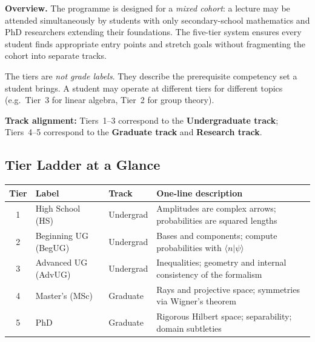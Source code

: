 \documentclass[11pt,a4paper]{article}
\begin{document}
\begin{tcolorbox}[goldbox]
\textbf{Overview.}
The programme is designed for a \emph{mixed cohort}: a lecture may be attended
simultaneously by students with only secondary-school mathematics and PhD
researchers extending their foundations.
The five-tier system ensures every student finds appropriate entry points and
stretch goals without fragmenting the cohort into separate tracks.

\medskip\noindent The tiers are \emph{not grade labels}. They describe the prerequisite
competency set a student brings. A student may operate at different tiers for
different topics (e.g.\ Tier~3 for linear algebra, Tier~2 for group theory).

\medskip\noindent\textbf{Track alignment:}
Tiers~1--3 correspond to the \textcolor{ugblue}{\textbf{Undergraduate track}};
Tiers~4--5 correspond to the \textcolor{gradred}{\textbf{Graduate track}}
and \textcolor{respath}{\textbf{Research track}}.
\end{tcolorbox}

\subsection{Tier Ladder at a Glance}

\begin{center}
\begin{tabular}{cllp{6cm}}
\toprule
\textbf{Tier} & \textbf{Label} & \textbf{Track} & \textbf{One-line description}\\
\midrule
1 & High School (HS)       & \textcolor{ugblue}{Undergrad}  &
    Amplitudes are complex arrows; probabilities are squared lengths\\
2 & Beginning UG (BegUG)   & \textcolor{ugblue}{Undergrad}  &
    Bases and components; compute probabilities with $\langle n|\psi\rangle$\\
3 & Advanced UG (AdvUG)    & \textcolor{ugblue}{Undergrad}  &
    Inequalities; geometry and internal consistency of the formalism\\
4 & Master's (MSc)         & \textcolor{gradred}{Graduate}  &
    Rays and projective space; symmetries via Wigner's theorem\\
5 & PhD                    & \textcolor{gradred}{Graduate}  &
    Rigorous Hilbert space; separability; domain subtleties\\
\bottomrule
\end{tabular}
\end{center}
\end{document}
